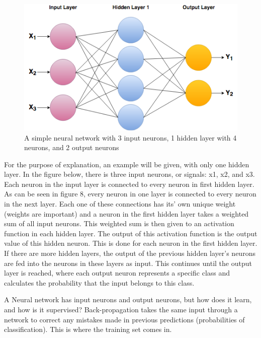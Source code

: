 \documentclass[12pt]{report} %
\begin{document}
\begin{figure}
\centering
\includegraphics[width=5in]{NeuralNetwork}
\caption{A simple neural network with 3 input neurons, 1 hidden layer with 4 neurons, and 2 output neurons}
\end{figure}
	For the purpose of explanation, an example will be given, with only one hidden layer. In the figure below, there is three input neurons, or signals: x1, x2, and x3. Each neuron in the input layer is connected to every neuron in first hidden layer. As can be seen in figure 8, every neuron in one layer is connected to every neuron in the next layer. Each one of these connections has its' own unique weight (weights are important) and a neuron in the first hidden layer takes a weighted sum of all input neurons. This weighted sum is then given to an activation function in each hidden layer. The output of this activation function is the output value of this hidden neuron. This is done for each neuron in the first hidden layer. If there are more hidden layers, the output of the previous hidden layer's neurons are fed into the neurons in these layers as input. This continues until the output layer is reached, where each output neuron represents a specific class and calculates the probability that the input belongs to this class.\cite{KubatMachineLearn}
	
 	A Neural network has input neurons and output neurons, but how does it learn, and how is it supervised? Back-propagation takes the same input through a network to correct any mistakes made in previous predictions (probabilities of classification). This is where the training set comes in. 
\end{document}
